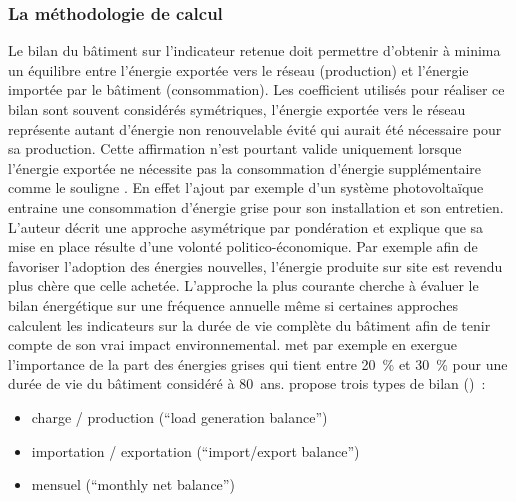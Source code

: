 \subsubsection{La méthodologie de calcul} %
\label{ssub:la_methodologie_de_calcul}
Le bilan du bâtiment sur l’indicateur retenue doit permettre d’obtenir à minima un équilibre
entre l’énergie exportée vers le réseau (production) et l’énergie importée par le
bâtiment (consommation).
Les coefficient utilisés pour réaliser ce bilan sont souvent considérés
symétriques, l’énergie exportée vers le réseau représente
autant d’énergie non renouvelable évité qui aurait été nécessaire pour sa production.
Cette affirmation n’est pourtant valide
uniquement lorsque l’énergie exportée ne nécessite pas la consommation d’énergie
supplémentaire comme le souligne \textcite{Sartori2012220}. En effet l’ajout par exemple d’un système
photovoltaïque entraine une consommation d’énergie grise pour son installation et
son entretien. L’auteur décrit une approche asymétrique par pondération et explique que
sa mise en place résulte d’une volonté politico-économique. Par exemple afin
de favoriser l’adoption des énergies nouvelles, l’énergie produite sur site
est revendu plus chère que celle achetée.
L’approche la plus courante cherche à évaluer le bilan énergétique sur une fréquence annuelle
même si certaines approches calculent les indicateurs sur la durée de vie complète
du bâtiment afin de tenir compte de son vrai impact environnemental.
\textcite{Voss201146} met par exemple en exergue l’importance de la part des énergies grises
qui tient entre \SI{20}{\percent} et \SI{30}{\percent} pour une durée de vie du bâtiment
considéré à \SI{80}{ans}.\textcite{Sartori2012220} propose trois types de bilan ()~:
\begin{itemize}
    \item charge / production (\enquote{load generation balance})
    \item importation / exportation (\enquote{import/export balance})
    \item mensuel (\enquote{monthly net balance})
\end{itemize}

